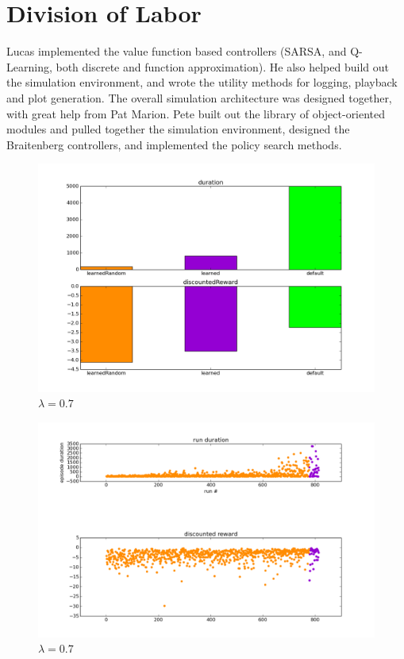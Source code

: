 \documentclass{article}
\begin{document}
\section{Division of Labor}

Lucas implemented the value function based controllers (SARSA, and Q-Learning, both discrete and function approximation). He also helped build out the simulation environment, and wrote the utility methods for logging, playback and plot generation. The overall simulation architecture was designed together, with great help from Pat Marion. Pete built out the library of object-oriented modules and pulled together the simulation environment, designed the Braitenberg controllers, and implemented the policy search methods.


\begin{figure}
\centering
\includegraphics[scale=0.5]{figures/sarsaDiscrete_lam_0_7_6500_bar_all_controllers.png}
\caption{$\lambda = 0.7$}
\label{figures/sarsaDiscrete_lam_0_7_6500_bar_all_controllers.png}
\end{figure}

\begin{figure}
\centering
\includegraphics[scale=0.5]{figures/sarsaDiscrete_lam_0_7_6500_time_series_learned_controllers.png}
\caption{$\lambda = 0.7$}
\label{figures/sarsaDiscrete_lam_0_7_6500_time_series_learned_controllers.png}
\end{figure}
\end{document}
